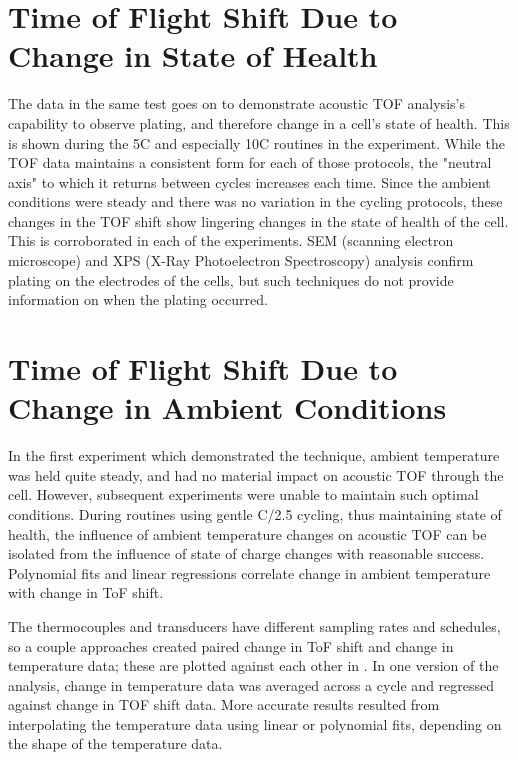 
\section{Time of Flight Shift Due to Change in State of Health}
The data in the same test goes on to demonstrate acoustic TOF analysis's capability to observe plating, and therefore change in a cell's state of health. This is shown during the 5C and especially 10C routines in the experiment. 
While the TOF data maintains a consistent form for each of those protocols, the "neutral axis" to which it returns between cycles increases each time. 
Since the ambient conditions were steady and there was no variation in the cycling protocols, these changes in the TOF shift show lingering changes in the state of health of the cell. 
This is corroborated in each of the experiments. 
SEM (scanning electron microscope) and XPS (X-Ray Photoelectron Spectroscopy) analysis confirm plating on the electrodes of the cells, but such techniques do not provide information on when the plating occurred. 


\section{Time of Flight Shift Due to Change in Ambient Conditions}
In the first experiment which demonstrated the technique, ambient temperature was held quite steady, and had no material impact on acoustic TOF through the cell. 
However, subsequent experiments were unable to maintain such optimal conditions.
During routines using gentle C/2.5 cycling, thus maintaining state of health, the influence of ambient temperature changes on acoustic TOF can be isolated from the influence of state of charge changes with reasonable success. 
Polynomial fits and linear regressions correlate change in ambient temperature with change in ToF shift. 

The thermocouples and transducers have different sampling rates and schedules, so a couple approaches created paired change in ToF shift and change in temperature data; these are plotted against each other in . 
In one version of the analysis, change in temperature data was averaged across a cycle and regressed against change in TOF shift data. 
More accurate results resulted from interpolating the temperature data using linear or polynomial fits, depending on the shape of the temperature data.

